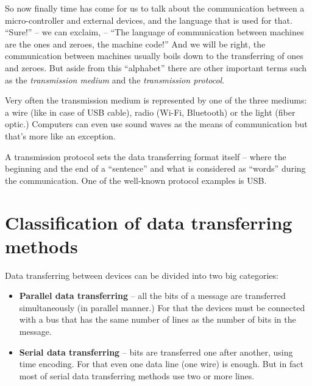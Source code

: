 \documentclass[../sparc.tex]{subfiles}
\begin{document}

So now finally time has come for us to talk about the communication between a
micro-controller and external devices, and the language that is used for that.
``Sure!'' -- we can exclaim, -- ``The language of communication between machines
are the ones and zeroes, the machine code!''  And we will be right, the
communication between machines usually boils down to the transferring of ones
and zeroes.  But aside from this ``alphabet'' there are other important terms
such as the \emph{transmission medium} and the \emph{transmission protocol}.

Very often the transmission medium is represented by one of the three mediums: a
wire (like in case of USB cable), radio (Wi-Fi, Bluetooth) or the light (fiber
optic.)  Computers can even use sound waves as the means of communication but
that's more like an exception.

A transmission protocol sets the data transferring format itself -- where the
beginning and the end of a ``sentence'' and what is considered as ``words''
during the communication.  One of the well-known protocol examples is USB.

\section{Classification of data transferring methods}


Data transferring between devices can be divided into two big categories:

\begin{itemize}
\item \textbf{Parallel data transferring} -- all the bits of a message are
  transferred simultaneously (in parallel manner.)  For that the devices must be
  connected with a bus that has the same number of lines as the number of bits
  in the message.
\item \textbf{Serial data transferring} -- bits are transferred one after
  another, using time encoding.  For that even one data line (one wire) is
  enough.  But in fact most of serial data transferring methods use two or more
  lines.
\end{itemize}
\end{document}
